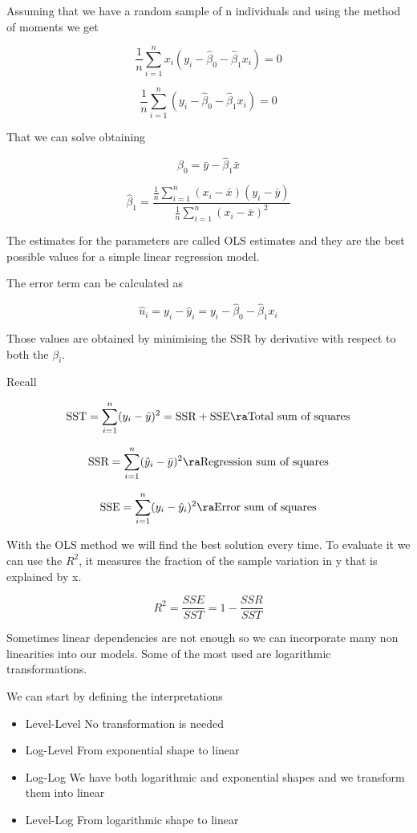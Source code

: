 Assuming that we have a random sample of n individuals and using the method of moments we get

\[
\frac{1}{n} \sum_{i=1}^{n} x_i \left( y_i - \hat{\beta}_0 - \hat{\beta}_1 x_i \right) = 0
\tag{2}
\]

\[
\frac{1}{n} \sum_{i=1}^{n} \left( y_i - \hat{\beta}_0 - \hat{\beta}_1 x_i \right) = 0
\]

That we can solve obtaining 

\[
\hat{\beta}_0 = \bar{y} - \hat{\beta}_1 \bar{x}
\tag{4}
\]

\[
\hat{\beta}_1 =
\frac{\frac{1}{n} \sum_{i=1}^{n} (x_i - \bar{x})(y_i - \bar{y})}
{\frac{1}{n} \sum_{i=1}^{n} (x_i - \bar{x})^2}
\]


The estimates for the parameters are called OLS estimates and they are the best possible values for a simple linear regression model.

The error term can be calculated as

\[
\hat{u}_i = y_i - \hat{y}_i = y_i - \hat{\beta}_0 - \hat{\beta}_1 x_i
\]

Those values are obtained by minimising the SSR by derivative with respect to both the $\beta_i$.

\vspace{10pt}

Recall

\[
\text{SST} = \sum_{i=1}^n (y_i - \bar{y})^2 = \text{SSR} + \text{SSE} \ra \text{Total sum of squares}
\]

\[
\text{SSR} = \sum_{i=1}^n (\hat{y}_i - \bar{y})^2 \ra \text{Regression sum of squares}
\]

\[
\text{SSE} = \sum_{i=1}^n (y_i - \hat{y}_i)^2 \ra \text{Error sum of squares}
\]


With the OLS method we will find the best solution every time. To evaluate it we can use the $R^2$, it measures the fraction of the sample variation in y that is explained by x.

\[
R^2 = \frac{SSE}{SST}=1-\frac{SSR}{SST}
\]


Sometimes linear dependencies are not enough so we can incorporate many non linearities into our models. 
Some of the most used are logarithmic transformations. 
\vspace{10pt}

We can start by defining the interpretations

\begin{itemize}
    \item Level-Level \ra No transformation is needed
    \item Log-Level \ra From exponential shape to linear 
       \item Log-Log \ra We have both logarithmic and exponential shapes and we transform them into linear
    \item Level-Log \ra From logarithmic shape to linear 
 
\end{itemize}

